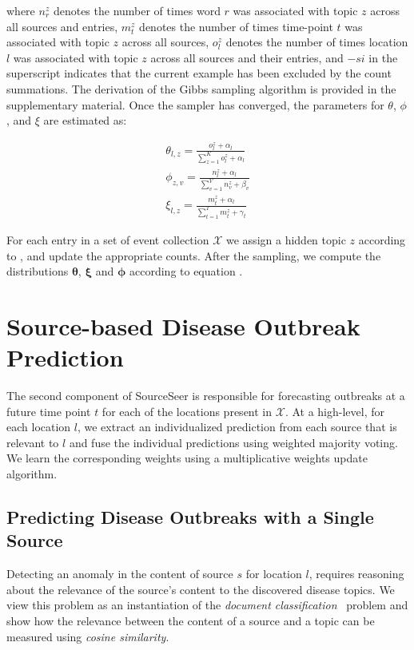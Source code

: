 \documentclass[twoside,leqno,twocolumn]{article}
\newcommand{\fullmodel}{{{\sf SourceSeer}}\xspace}
\begin{document}
\noindent where $n^{z}_{r}$ denotes the number of times word $r$ was associated with topic $z$ across all sources and entries, $m^{z}_{t}$ denotes the number of times time-point $t$ was associated with topic $z$ across all sources, $o^z_l$ denotes the number of times location $l$ was associated with topic $z$ across all sources and their entries, and $-si$ in the superscript indicates that the current example has been excluded by the count summations. The derivation of the Gibbs sampling algorithm is provided in the supplementary material. Once the sampler has converged, the parameters for $\theta$, $\phi$, and $\xi$ are estimated as:

{\small \begin{align}
\label{eq:updates}
\theta_{l,z} = \frac{o^z_l + \alpha_l}{\sum_{z=1}^K o^z_l + \alpha_l} \nonumber \\
\phi_{z,v} = \frac{n^z_l + \alpha_l}{\sum_{v=1}^V n^z_v + \beta_v}  \\
\xi_{l,z} = \frac{m^z_t + \alpha_l}{\sum_{t=1}^T m^z_t + \gamma_t} \nonumber
\end{align}}

For each entry in a set of event collection $\mathcal{X}$ we assign a hidden topic $z$ according to , and update the appropriate counts. After the sampling, we compute the distributions ${\boldsymbol \theta}$, ${\boldsymbol \xi}$ and ${\boldsymbol \phi}$ according to equation .   

\section{Source-based Disease Outbreak Prediction}
\label{sec:pred}
The second component of \fullmodel is responsible for forecasting outbreaks at a future time point $t$ for each of the locations present in $\mathcal{X}$. At a high-level, for each location $l$, we extract an individualized prediction from each source that is relevant to $l$ and fuse the individual predictions using weighted majority voting. We learn the corresponding weights using a multiplicative weights update algorithm.

\subsection{Predicting Disease Outbreaks with a Single Source}
\label{sec:source_pred}
Detecting an anomaly in the content of source $s$ for location $l$, requires reasoning about the relevance of the source's content to the discovered disease topics. We view this problem as an instantiation of the {\em document classification}~\cite{strehl:2000} problem and show how the relevance between the content of a source and a topic can be measured using {\em cosine similarity}.
\end{document}
